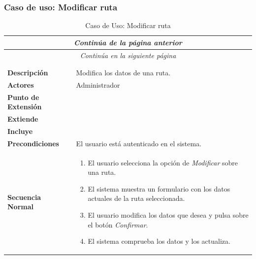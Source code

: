\subsubsection*{Caso de uso: Modificar ruta }
\begin{longtable}{| p{4cm} | p{10cm} |}
\endfirsthead
\multicolumn{2}{c}{\textit{Continúa de la página anterior}}\\[12pt]
\hline
\endhead
\hline
\multicolumn{2}{c}{\textit{Continúa en la siguiente página}} \\
\endfoot
\hline
\caption{Caso de Uso: Modificar ruta}\label{fig:1}\\
\endlastfoot


\hline
\multicolumn{2}{|c|}{\textbf{CU$<$29$>$ - Modificar Ruta}} \\

\hline
\textbf{Descripción} &
Modifica los datos de una ruta.\\

\hline
\textbf{Actores} &
Administrador\\

\hline
\textbf{Punto de Extensión} &
\\

\hline
\textbf{Extiende} &
\\

\hline
\textbf{Incluye} &
\\

\hline
\textbf{Precondiciones} &
El usuario está autenticado en el sistema.\\

\hline
\textbf{Secuencia Normal} &\mbox{}\par\vspace{-\baselineskip}
\begin{enumerate}[leftmargin=0.7cm, topsep=0.1cm]
\item El usuario selecciona la opción de \textit{Modificar} sobre una ruta.
\item El sistema muestra un formulario con los datos actuales de la ruta seleccionada.
\item El usuario modifica los datos que desea y pulsa sobre el botón \textit{Confirmar}.
\item El sistema comprueba los datos y los actualiza.
\end{enumerate}



\end{longtable}
